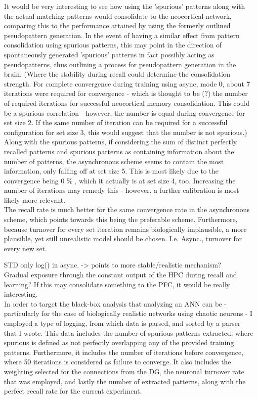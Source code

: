 It would be very interesting to see how using the 'spurious' patterns along with the actual matching patterns would consolidate to the neocortical network, comparing this to the performance attained by using the formerly outlined pseudopattern generation. In the event of having a similar effect from pattern consolidation using spurious patterns, this may point in the direction of spontaneously generated 'spurious' patterns in fact possibly acting as pseudopatterns, thus outlining a process for pseudopattern generation in the brain. (Where the stability during recall could determine the consolidation strength. For complete convergence during training using async, mode 0, about 7 iterations were required for convergence - which is thought to be (?) the number of required iterations for successful neocortical memory consolidation. This could be a spurious correlation - however, the number is equal during convergence for set size 2. If the same number of iteration can be required for a successful configuration for set size 3, this would suggest that the number is not spurious.)
\\

Along with the spurious patterns, if considering the sum of distinct perfectly recalled patterns and spurious patterns as containing information about the number of patterns, the asynchronous scheme seems to contain the most information, only falling off at set size 5. This is most likely due to the convergence being 0 \% , which it actually is at set size 4, too. Increasing the number of iterations may remedy this - however, a further calibration is most likely more relevant.
\\

The recall rate is much better for the same convergence rate in the asynchronous scheme, which points towards this being the preferable scheme. Furthermore, because turnover for every set iteration remains biologically implausible, a more plausible, yet still unrealistic model should be chosen. I.e. Async., turnover for every new set.

STD only log() in async. -> points to more stable/realistic mechanism?
\\

Gradual exposure through the constant output of the HPC during recall and learning? If this may consolidate something to the PFC, it would be really interesting.
\\

In order to target the black-box analysis that analyzing an ANN can be - particularly for the case of biologically realistic networks using chaotic neurons - I employed a type of logging, from which data is parsed, and sorted by a parser that I wrote. This data includes the number of spurious patterns extracted, where spurious is defined as not perfectly overlapping any of the provided training patterns. Furthermore, it includes the number of iterations before convergence, where 50 iterations is considered as failure to converge. It also includes the weighting selected for the connections from the DG, the neuronal turnover rate that was employed, and lastly the number of extracted patterns, along with the perfect recall rate for the current experiment.


